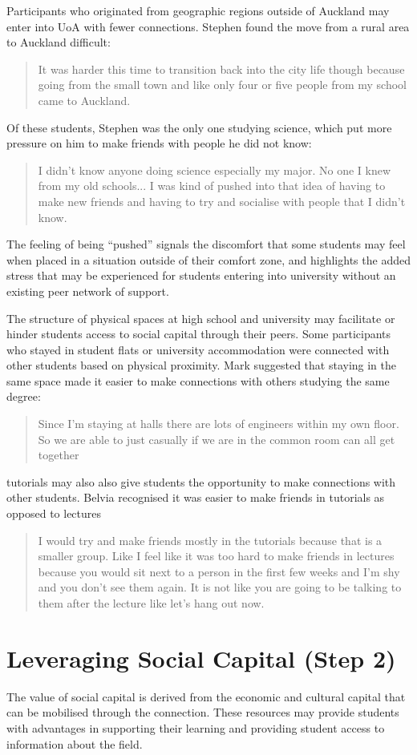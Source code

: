 Participants who originated from geographic regions outside of Auckland may enter into UoA with fewer connections. Stephen found the move from a rural area to Auckland difficult: \blockquote{It was harder this time to transition back into the city life though because going from the small town and like only four or five people from my school came to Auckland.} Of these students, Stephen was the only one studying science, which put more pressure on him to make friends with people he did not know: \blockquote{I didn't know anyone doing science especially my major. No one I knew from my old schools... I was kind of pushed into that idea of having to make new friends and having to try and socialise with people that I didn't know.} The feeling of being ``pushed'' signals the discomfort that some students may feel when placed in a situation outside of their comfort zone, and highlights the added stress that may be experienced for students entering into university without an existing peer network of support. 

The structure of physical spaces at high school and university may facilitate or hinder students access to social capital through their peers. Some participants who stayed in student flats or university accommodation were connected with other students based on physical proximity. Mark suggested that staying in the same space made it easier to make connections with others studying the same degree: \blockquote{Since I’m staying at halls there are lots of engineers within my own floor. So we are able to just casually if we are in the common room can all get together}. tutorials may also also give students the opportunity to make connections with other students. Belvia recognised it was easier to make friends in tutorials as opposed to lectures \blockquote{I would try and make friends mostly in the tutorials because that is a smaller group. Like I feel like it was too hard to make friends in lectures because you would sit next to a person in the first few weeks and I’m shy and you don’t see them again. It is not like you are going to be talking to them after the lecture like let’s hang out now.}. 


\section{Leveraging Social Capital (Step 2)}
The value of social capital is derived from the economic and cultural capital that can be mobilised through the connection. These resources may provide students with advantages in supporting their learning and providing student access to information about the field. 

